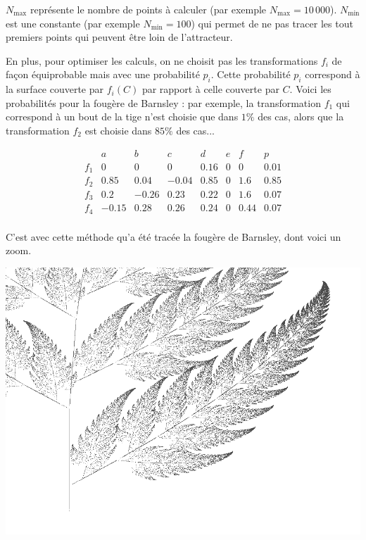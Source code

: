 \documentclass[11pt,class=report,crop=false]{standalone}
\begin{document}
\bigskip

$N_{\max}$ représente le nombre de points à calculer (par exemple $N_{\max} = 10\,000$).
$N_{\min}$ est une constante (par exemple $N_{\min} = 100$) qui permet de ne pas tracer les tout premiers points
qui peuvent être loin de l'attracteur.


En plus, pour optimiser les calculs, on ne choisit pas les transformations $f_i$ de façon équiprobable mais 
avec une probabilité $p_i$. Cette probabilité $p_i$ correspond à la surface couverte par $f_i(C)$ par rapport à celle couverte par $C$. Voici les probabilités pour la fougère de Barnsley : par exemple, la transformation
$f_1$ qui correspond à un bout de la tige n'est choisie que dans $1\%$ des cas, alors que la transformation
$f_2$ est choisie dans $85\%$ des cas...


\begin{displaymath}
\begin{array}{c|ccccccc}
     & a & b & c & d & e & f & p\\
\hline
f_1 & 0 & 0 & 0 & 0.16 & 0 & 0 & 0.01\\
\hline
f_2  & 0.85 &0.04&-0.04&0.85&0&1.6 & 0.85 \\
\hline
f_3 & 0.2 & -0.26 & 0.23 & 0.22 & 0 & 1.6 & 0.07 \\
\hline
f_4  & -0.15 & 0.28 & 0.26 & 0.24 & 0 & 0.44 & 0.07 \\
\end{array}
\end{displaymath}

\medskip

C'est avec cette méthode qu'a été tracée la fougère de Barnsley, dont voici un zoom.

\begin{center}
 \includegraphics[scale=.2]{images/IFS-fern2.png} 
\end{center}
\end{document}
